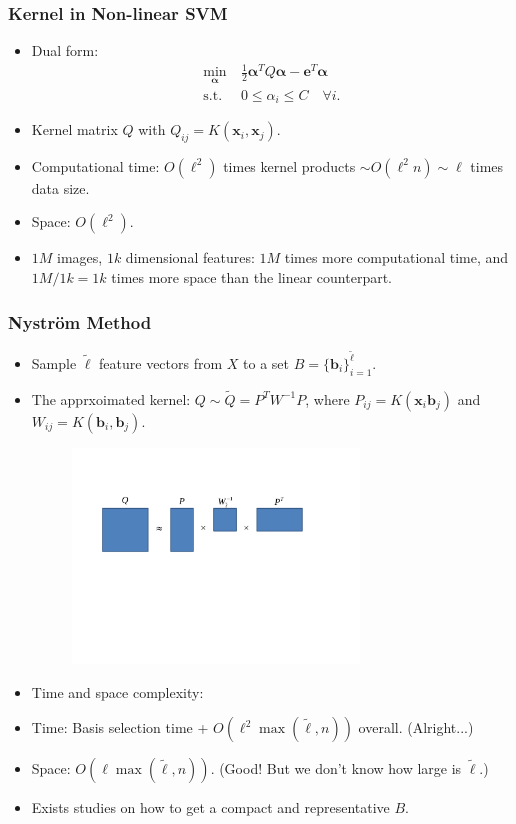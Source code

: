 \documentclass{beamer}
\def\bb{{\boldsymbol b}}
\def\balpha{{\boldsymbol \alpha}}
\def\bb{{\boldsymbol b}}
\def\be{{\boldsymbol e}}
\def\bx{{\boldsymbol x}}
\begin{document}
\begin{frame}
  \frametitle{Kernel in Non-linear SVM}
  \begin{itemize}
    \item Dual form:
    \begin{align}
    \label{eq:svmdual} \nonumber
    \min_{\balpha} \  &  \frac{1}{2} \balpha^T Q  \balpha - \be^T \balpha \nonumber \\
    \mbox{s.t.} \  & 0 \le \alpha_i \le C \quad \forall i \mbox{.} \nonumber
    \end{align}
    \item Kernel matrix $Q$ with $Q_{ij} = K(\bx_i, \bx_j)$.
    \pause
    \item [] Computational time: $O(\ell^2)$ times kernel products $\sim O(\ell^2 n) \sim \ell$ times data size.
    \item [] Space: $O(\ell^2)$.
    \pause
    \item $1M$ images, $1k$ dimensional features: $1M$ times more computational time, and $1M/1k = 1k$ times more space than the linear counterpart.
  \end{itemize}
\end{frame}

\begin{frame}
  \frametitle{Nystr\"om Method}
  \begin{itemize}
    \item Sample $\tilde{\ell}$ feature vectors from $X$ to a set $B = \{\bb_i\}_{i = 1}^{\tilde{\ell}}$.
    \item The apprxoimated kernel: $Q \sim \tilde{Q} = P^TW^{-1}P$,
    where $P_{ij} = K(\bx_i \bb_j)$ and $W_{ij} = K(\bb_i, \bb_j)$.
\begin{figure}
  \includegraphics[width=3in]{nystrom.pdf}\\
\end{figure}


    \pause
    \item Time and space complexity:
    \item [] Time: Basis selection time + $O(\ell^2 \max(\tilde{\ell}, n))$ overall. (Alright...)
    \item [] Space: $O(\ell \max(\tilde{\ell}, n))$. (Good! But we don't know how large is $\tilde{\ell}$.)
    \pause
    \item Exists studies on how to get a compact and representative $B$.
  \end{itemize}
\end{frame}
\end{document}

